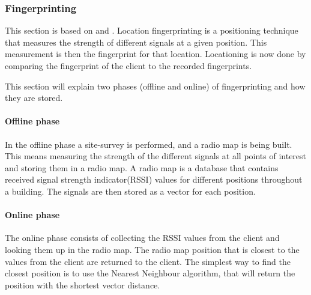 \subsubsection{Fingerprinting}\label{fingerprinting}
This section is based on \citet{fingerprinting_slides} and \citet{fingerprinting}.
Location fingerprinting is a positioning technique that measures the strength of different signals at a given position.
This measurement is then the fingerprint for that location.
Locationing is now done by comparing the fingerprint of the client to the recorded fingerprints.

This section will explain two phases (offline and online) of fingerprinting and how they are stored.
\paragraph{Offline phase}
In the offline phase a site-survey is performed, and a radio map is being built.
This means measuring the strength of the different signals at all points of interest and storing them in a radio map.
A radio map is a database that contains received signal strength indicator(RSSI) values for different positions throughout a building.
The signals are then stored as a vector for each position.

\paragraph{Online phase}
The online phase consists of collecting the RSSI values from the client and looking them up in the radio map.
The radio map position that is closest to the values from the client are returned to the client.
The simplest way to find the closest position is to use the Nearest Neighbour algorithm, that will return the position with the shortest vector distance.
